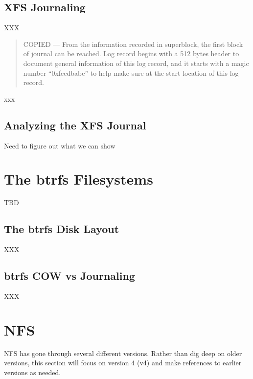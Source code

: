 \subsection{XFS Journaling}


XXX

\begin{quote}
COPIED --- From the information recorded in superblock, the first block of journal can be reached. Log record begins with a 512 bytes header to document general information of this log record, and it starts with a magic number “0xfeedbabe” to help make sure at the start location of this log record.
\end{quote}

\noindent
xxx

\subsection{Analyzing the XFS Journal}

Need to figure out what we can show


\section{The btrfs Filesystems}

TBD

\subsection{The btrfs Disk Layout}

XXX

\subsection{btrfs COW vs Journaling}

XXX


\section{NFS}\label{nfs-chapter}

NFS has gone through several different versions. Rather than dig deep on older versions, this section will focus on version 4 (v4) and make references to earlier versions as needed.

